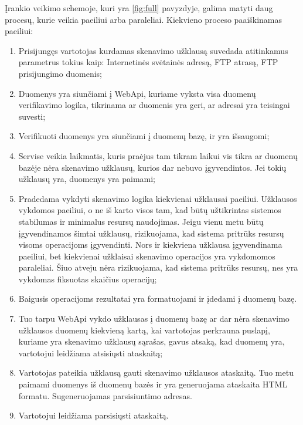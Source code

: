 \documentclass[a4paper,12pt,fleqn]{article}
\begin{document}
Įrankio veikimo schemoje, kuri yra \ref{fig:full} pavyzdyje, galima matyti daug procesų, kurie veikia paeiliui arba paraleliai. Kiekvieno proceso paaiškinamas paeiliui:

\begin{enumerate}
	
	\item Prisijungęs vartotojas kurdamas skenavimo užklausą suvedada atitinkamus parametrus tokius kaip: Internetinės svėtainės adresą, FTP atrasą, FTP prisijungimo duomenis;
	
	\item Duomenys yra siunčiami į WebApi, kuriame vyksta visa duomenų verifikavimo logika, tikrinama ar duomenis yra geri, ar adresai yra teisingai suvesti;
	
	\item Verifikuoti duomenys yra siunčiami į duomenų bazę, ir yra išsaugomi;
	
	\item Servise veikia laikmatis, kuris praėjus tam tikram laikui vis tikra ar duomenų bazėje nėra skenavimo užklausų, kurios dar nebuvo įgyvendintos. Jei tokių užklausų yra, duomenys yra paimami;
	
	\item  Pradedama vykdyti skenavimo logika kiekvienai užklausai paeiliui. Užklausos vykdomos paeiliui, o ne iš karto visos tam, kad būtų užtikrintas sistemos stabilumas ir minimalus resursų naudojimas. Jeigu vienu metu būtų įgyvendinamos šimtai užklausų, rizikuojama, kad sistema pritrūks resursų visoms operacijoms įgyvendinti. Nors ir kiekviena užklausa įgyvendinama paeiliui, bet kiekvienai užklaisai skenavimo operacijos yra vykdomomos paraleliai. Šiuo atveju nėra rizikuojama, kad sistema pritrūks resursų, nes yra vykdomas fiksuotas skaičius operacijų;
	
	\item Baigusis operacijoms rezultatai yra formatuojami ir įdedami į duomenų bazę.
	
	\item Tuo tarpu WebApi vykdo užklausas į duomenų bazę ar dar nėra skenavimo užklausos duomenų kiekvieną kartą, kai vartotojas perkrauna puslapį, kuriame yra skenavimo užklausų sąrašas, gavus atsaką, kad duomenų yra, vartotojui leidžiama atsisiųsti ataskaitą;
	
	\item Vartotojas pateikia užklausą gauti skenavimo užklausos ataskaitą. Tuo metu paimami duomenys iš duomenų bazės ir yra generuojama ataskaita HTML formatu. Sugeneruojamas parsisiuntimo adresas.
	
	\item Vartotojui leidžiama parsisiųsti ataskaitą.
	
\end{enumerate}
\end{document}
